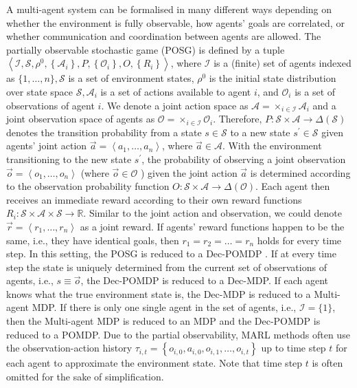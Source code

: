 \documentclass{article}
\begin{document}
A multi-agent system can be formalised in many different ways \citep{oliehoek2016concise} depending on whether the environment is fully observable, how agents' goals are correlated, or whether communication and coordination between agents are allowed. The partially observable stochastic game (POSG) \citep{hansen2004dynamic} is defined by a tuple $\left\langle\mathcal{I}, \mathcal{S}, \rho^0,\left\{\mathcal{A}_i\right\}, P,\left\{\mathcal{O}_i\right\}, O,\left\{R_i\right\}\right\rangle$, where $\mathcal{I}$ is a (finite) set of agents indexed as $\{1, \ldots, n\}, \mathcal{S}$ is a set of environment states, $\rho^0$ is the initial state distribution over state space $\mathcal{S}, \mathcal{A}_i$ is a set of actions available to agent $i$, and $\mathcal{O}_i$ is a set of observations of agent $i$. We denote a joint action space as $\mathcal{A}=\times_{i \in \mathcal{I}} \mathcal{A}_i$ and a joint observation space of agents as $\mathcal{O}=\times_{i \in \mathcal{I}} \mathcal{O}_i$. Therefore, $P: \mathcal{S} \times \mathcal{A} \rightarrow \Delta(\mathcal{S})$ denotes the transition probability from a state $s \in \mathcal{S}$ to a new state $s^{\prime} \in \mathcal{S}$ given agents' joint action $\vec{a}=\left\langle a_1, \ldots, a_n\right\rangle$, where $\vec{a} \in \mathcal{A}$. With the environment transitioning to the new state $s^{\prime}$, the probability of observing a joint observation $\vec{o}=\left\langle o_1, \ldots, o_n\right\rangle$ (where $\vec{o} \in \mathcal{O}$ ) given the joint action $\vec{a}$ is determined according to the observation probability function $O: \mathcal{S} \times \mathcal{A} \rightarrow \Delta(\mathcal{O})$. Each agent then receives an immediate reward according to their own reward functions $R_i: \mathcal{S} \times \mathcal{A} \times \mathcal{S} \rightarrow \mathbb{R}$. Similar to the joint action and observation, we could denote $\vec{r}=\left\langle r_1, \ldots, r_n\right\rangle$ as a joint reward. If agents' reward functions happen to be the same, i.e., they have identical goals, then $r_1=r_2=\ldots=r_n$ holds for every time step. In this setting, the POSG is reduced to a Dec-POMDP \citep{oliehoek2016concise}. If at every time step the state is uniquely determined from the current set of observations of agents, i.e., $s \equiv \vec{o}$, the Dec-POMDP is reduced to a Dec-MDP. If each agent knows what the true environment state is, the Dec-MDP is reduced to a Multi-agent MDP. If there is only one single agent in the set of agents, i.e., $\mathcal{I}=\{1\}$, then the Multi-agent MDP is reduced to an MDP and the Dec-POMDP is reduced to a POMDP. Due to the partial observability, MARL methods often use the observation-action history $\tau_{i, t}=\left\{o_{i, 0}, a_{i, 0}, o_{i, 1}, \ldots, o_{i, t}\right\}$ up to time step $t$ for each agent to approximate the environment state. Note that time step $t$ is often omitted for the sake of simplification.
\end{document}
